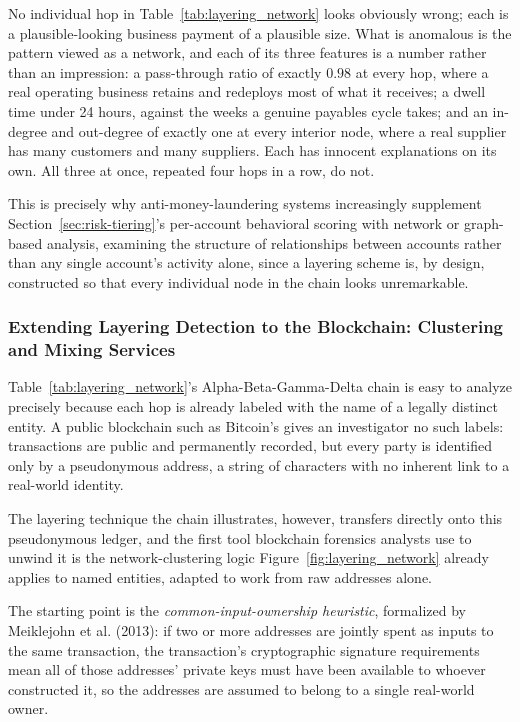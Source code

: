 \documentclass[../ai_in_finance]{subfiles}
\begin{document}
No individual hop in Table~\ref{tab:layering_network} looks obviously wrong; each is a plausible-looking business payment of a plausible size. What is anomalous is the pattern viewed as a network, and each of its three features is a number rather than an impression: a pass-through ratio of exactly $0.98$ at every hop, where a real operating business retains and redeploys most of what it receives; a dwell time under 24 hours, against the weeks a genuine payables cycle takes; and an in-degree and out-degree of exactly one at every interior node, where a real supplier has many customers and many suppliers. Each has innocent explanations on its own. All three at once, repeated four hops in a row, do not.

This is precisely why anti-money-laundering systems increasingly supplement Section~\ref{sec:risk-tiering}'s per-account behavioral scoring with network or graph-based analysis, examining the structure of relationships between accounts rather than any single account's activity alone, since a layering scheme is, by design, constructed so that every individual node in the chain looks unremarkable.

\subsubsection*{Extending Layering Detection to the Blockchain: Clustering and Mixing Services}
\label{sec:blockchain-forensics}

Table~\ref{tab:layering_network}'s Alpha-Beta-Gamma-Delta chain is easy to analyze precisely because each hop is already labeled with the name of a legally distinct entity. A public blockchain such as Bitcoin's gives an investigator no such labels: transactions are public and permanently recorded, but every party is identified only by a pseudonymous address, a string of characters with no inherent link to a real-world identity.

The layering technique the chain illustrates, however, transfers directly onto this pseudonymous ledger, and the first tool blockchain forensics analysts use to unwind it is the network-clustering logic Figure~\ref{fig:layering_network} already applies to named entities, adapted to work from raw addresses alone.

The starting point is the \emph{common-input-ownership heuristic}, formalized by Meiklejohn et al. (2013): if two or more addresses are jointly spent as inputs to the same transaction, the transaction's cryptographic signature requirements mean all of those addresses' private keys must have been available to whoever constructed it, so the addresses are assumed to belong to a single real-world owner.
\end{document}
